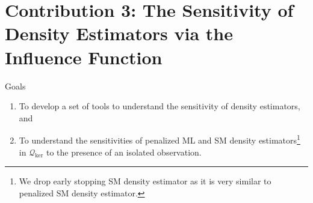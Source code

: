 \documentclass[aspectratio=169,xcolor=dvipsnames]{beamer}
\newcommand{\SM}{\mathrm{SM}}
\begin{document}


\section{Contribution 3: The Sensitivity of Density Estimators via the Influence Function}

%


\begin{frame}{Goals}
	
	\begin{enumerate}
		\item To develop a set of tools to understand the sensitivity of density estimators, and 
		\item To understand the sensitivities of penalized ML and SM density estimators\footnote{We drop early stopping SM density estimator as it is very similar to penalized SM density estimator. } in $\mathcal{Q}_{\mathrm{ker}}$ to the presence of an isolated observation. %
	\end{enumerate}
	
\end{frame}


%	
%	
%	
\end{document}
